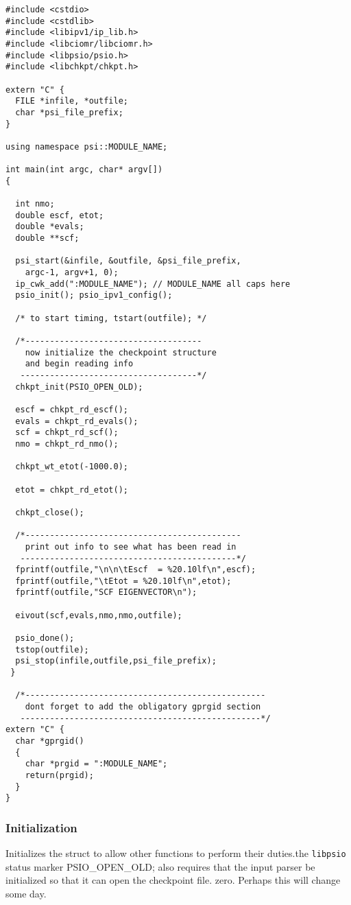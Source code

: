 \begin{verbatim}
#include <cstdio>
#include <cstdlib>
#include <libipv1/ip_lib.h>
#include <libciomr/libciomr.h>
#include <libpsio/psio.h>
#include <libchkpt/chkpt.h>

extern "C" {
  FILE *infile, *outfile;
  char *psi_file_prefix;
}

using namespace psi::MODULE_NAME; 

int main(int argc, char* argv[])
{
 
  int nmo;
  double escf, etot;
  double *evals;
  double **scf;

  psi_start(&infile, &outfile, &psi_file_prefix,
    argc-1, argv+1, 0);
  ip_cwk_add(":MODULE_NAME"); // MODULE_NAME all caps here
  psio_init(); psio_ipv1_config();

  /* to start timing, tstart(outfile); */

  /*------------------------------------
    now initialize the checkpoint structure
    and begin reading info
   ------------------------------------*/
  chkpt_init(PSIO_OPEN_OLD);

  escf = chkpt_rd_escf();
  evals = chkpt_rd_evals();
  scf = chkpt_rd_scf();
  nmo = chkpt_rd_nmo();
 
  chkpt_wt_etot(-1000.0);
  
  etot = chkpt_rd_etot();

  chkpt_close();

  /*--------------------------------------------
    print out info to see what has been read in
   --------------------------------------------*/
  fprintf(outfile,"\n\n\tEscf  = %20.10lf\n",escf);
  fprintf(outfile,"\tEtot = %20.10lf\n",etot);
  fprintf(outfile,"SCF EIGENVECTOR\n");

  eivout(scf,evals,nmo,nmo,outfile); 
  
  psio_done();
  tstop(outfile);
  psi_stop(infile,outfile,psi_file_prefix);
 }

  /*-------------------------------------------------
    dont forget to add the obligatory gprgid section 
   -------------------------------------------------*/
extern "C" {
  char *gprgid()
  {
    char *prgid = ":MODULE_NAME";
    return(prgid);
  }
}
\end{verbatim}

\subsubsection{Initialization}
{Initializes the  struct to allow other 
functions to perform their duties.}{the {\tt libpsio} status marker PSIO\_OPEN\_OLD; also requires that
the input parser be initialized so that it can open the checkpoint file.}
{zero.  Perhaps this will change some day.} \\

